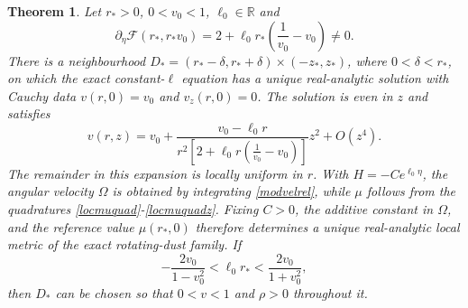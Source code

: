 \documentclass[amsmath,amsfonts,amssymb,aps,pra,superscriptaddress,10pt]{revtex4-2}
\numberwithin{equation}{section}
\theoremstyle{plain}
\newtheorem{theorem}{Theorem}
\theoremstyle{definition}
\theoremstyle{remark}
\theoremstyle{definition}
\newcommand{\ellzero}{\ell_0}
\begin{document}
\begin{theorem}\label{flattracexist}
Let $r_{*}>0$, $0<v_{0}<1$, $\ellzero\in\mathbb{R}$ and
\begin{equation}\label{ncflattraces}
\partial_\eta\mathcal{F}(r_*,r_*v_0)=2+\ellzero r_*\left(\frac{1}{v_0}-v_0\right)\neq 0.
\end{equation}
There is a neighbourhood $D_{*}=(r_{*}-\delta,r_{*}+\delta)\times(-z_{*},z_{*})$, where $0<\delta<r_{*}$, on which the exact constant-$\ell$ equation has a unique real-analytic solution with Cauchy data
$v(r,0)=v_{0}$ and $v_z(r,0)=0$. The solution is even in $z$ and satisfies
\begin{equation}\label{locflattraceexp}
v(r,z)=v_{0}+\frac{v_{0}-\ellzero r}{r^{2}\left[2+\ellzero r\left(\frac{1}{v_{0}}-v_{0}\right)\right]}z^{2}+O(z^{4}).
\end{equation}
The remainder in this expansion is locally uniform in $r$. With $H=-Ce^{\ellzero\eta}$, the angular velocity $\Omega$ is obtained by integrating \eqref{modvelrel}, while $\mu$ follows from the quadratures \eqref{locmuquad}-\eqref{locmuquadz}. Fixing $C>0$, the additive constant in $\Omega$, and the reference value $\mu(r_*,0)$ therefore determines a unique real-analytic local metric of the exact rotating-dust family. If
\begin{equation}\label{strictdensrstar}
-\frac{2v_{0}}{1-v_{0}^{2}}<\ellzero r_{*}
<\frac{2v_{0}}{1+v_{0}^{2}},
\end{equation}
then $D_{*}$ can be chosen so that $0<v<1$ and $\rho>0$ throughout it.
\end{theorem}
\end{document}
